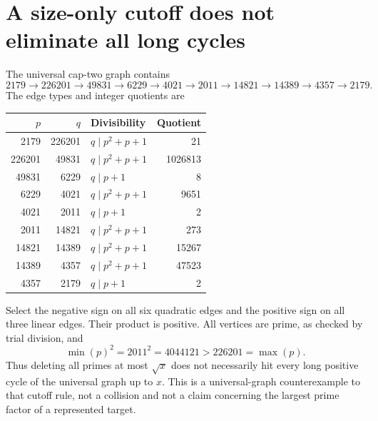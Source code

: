 \section{A size-only cutoff does not eliminate all long cycles}
The universal cap-two graph contains
\[
 2179\to226201\to49831\to6229\to4021\to2011
 \to14821\to14389\to4357\to2179.
\]
The edge types and integer quotients are
\begin{center}
\begin{tabular}{@{}rrlr@{}}\toprule
$p$ & $q$ & Divisibility & Quotient\\\midrule
2179&226201&$q\mid p^2+p+1$&21\\
226201&49831&$q\mid p^2+p+1$&1026813\\
49831&6229&$q\mid p+1$&8\\
6229&4021&$q\mid p^2+p+1$&9651\\
4021&2011&$q\mid p+1$&2\\
2011&14821&$q\mid p^2+p+1$&273\\
14821&14389&$q\mid p^2+p+1$&15267\\
14389&4357&$q\mid p^2+p+1$&47523\\
4357&2179&$q\mid p+1$&2\\\bottomrule
\end{tabular}
\end{center}
Select the negative sign on all six quadratic edges and the positive sign on all three linear edges. Their product is positive. All vertices are prime, as checked by trial division, and
\[
 \min(p)^2=2011^2=4044121>226201=\max(p).
\]
Thus deleting all primes at most $\sqrt{x}$ does not necessarily hit every long positive cycle of the universal graph up to $x$. This is a universal-graph counterexample to that cutoff rule, not a collision and not a claim concerning the largest prime factor of a represented target.

